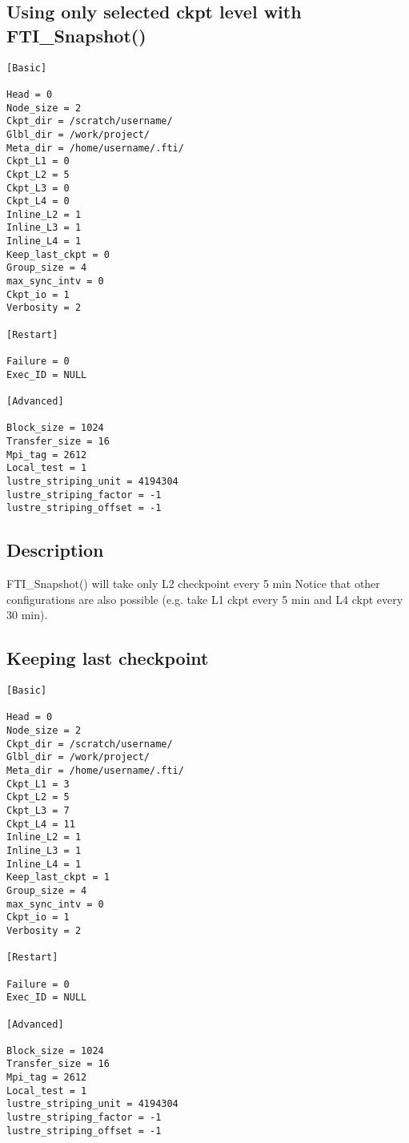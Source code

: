 \documentclass{refrep}
\begin{document}
\subsection{Using only selected ckpt level with FTI\_Snapshot()}\label{subsec:configoneckptlvl}
\begin{center}
\begin{lstlisting}[frame=single]
[Basic]

Head = 0
Node_size = 2
Ckpt_dir = /scratch/username/
Glbl_dir = /work/project/
Meta_dir = /home/username/.fti/
Ckpt_L1 = 0
Ckpt_L2 = 5
Ckpt_L3 = 0
Ckpt_L4 = 0
Inline_L2 = 1
Inline_L3 = 1
Inline_L4 = 1
Keep_last_ckpt = 0
Group_size = 4
max_sync_intv = 0
Ckpt_io = 1
Verbosity = 2

[Restart]

Failure = 0
Exec_ID = NULL

[Advanced]

Block_size = 1024
Transfer_size = 16
Mpi_tag = 2612
Local_test = 1
lustre_striping_unit = 4194304 
lustre_striping_factor = -1 
lustre_striping_offset = -1 

\end{lstlisting}
\end{center}
\subsection*{Description}
FTI\_Snapshot() will take only L2 checkpoint every 5 min Notice that other configurations are also possible (e.g. take L1 ckpt every 5 min and L4 ckpt every 30 min).
\newpage
\subsection{Keeping last checkpoint}\label{subsec:configkeeplastckpt}
\begin{center}
\begin{lstlisting}[frame=single]
[Basic]

Head = 0
Node_size = 2
Ckpt_dir = /scratch/username/
Glbl_dir = /work/project/
Meta_dir = /home/username/.fti/
Ckpt_L1 = 3
Ckpt_L2 = 5
Ckpt_L3 = 7
Ckpt_L4 = 11
Inline_L2 = 1
Inline_L3 = 1
Inline_L4 = 1
Keep_last_ckpt = 1
Group_size = 4
max_sync_intv = 0
Ckpt_io = 1
Verbosity = 2

[Restart]

Failure = 0
Exec_ID = NULL

[Advanced]

Block_size = 1024
Transfer_size = 16
Mpi_tag = 2612
Local_test = 1
lustre_striping_unit = 4194304 
lustre_striping_factor = -1 
lustre_striping_offset = -1 

\end{lstlisting}
\end{center}
\end{document}
